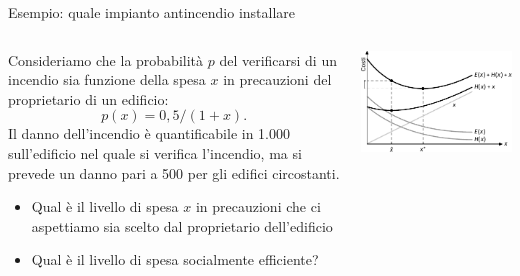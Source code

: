 \documentclass[aspectratio=64,11pt]{beamer}
\begin{document}
\begin{frame}{Esempio: quale impianto antincendio installare}
\begin{columns}
\begin{column}{.5\columnwidth}
Consideriamo che la probabilità $p$ del verificarsi di un incendio sia funzione
della spesa $x$ in precauzioni del proprietario di un edificio:
$$p(x) = 0,5/(1 + x).$$
Il danno dell’incendio è quantificabile in 1.000 sull'edificio
nel quale si verifica l'incendio, ma si prevede un danno pari a 500 per gli
edifici circostanti.
\begin{itemize}
\item Qual è il livello di spesa $x$ in precauzioni che ci aspettiamo sia scelto
dal proprietario dell'edificio
\item Qual è il livello di spesa socialmente efficiente?
\end{itemize}
\end{column}
\begin{column}{.5\columnwidth}
\begin{center}
\includegraphics[width=\textwidth]{./figure/esternalita-precauzioni.pdf}
\end{center}
\end{column}
\end{columns}
\end{frame}
\end{document}
